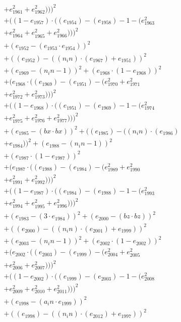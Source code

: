 \documentclass[10pt, a4paper]{article}
\begin{document}
\begin{align*}
& + e_{1961}^{2} + e_{1962}^{2})))^{2} \\
& + ((1 - e_{1957})  \cdot  ((e_{1954}) - (e_{1958}) - 1 - (e_{1963}^{2} \\
& + e_{1964}^{2} + e_{1965}^{2} + e_{1966}^{2})))^{2} \\
& + (e_{1952} - (e_{1953}  \cdot  e_{1954}))^{2} \\
& + ((e_{1952}) - ((n_in)  \cdot  (e_{1967}) + e_{1951}))^{2} \\
& + (e_{1969} - (n_in - 1))^{2} + (e_{1968}  \cdot  (1 - e_{1968}))^{2} \\
& + (e_{1968}  \cdot  ((e_{1969}) - (e_{1951}) - (e_{1970}^{2} + e_{1971}^{2} \\
& + e_{1972}^{2} + e_{1973}^{2})))^{2} \\
& + ((1 - e_{1968})  \cdot  ((e_{1951}) - (e_{1969}) - 1 - (e_{1974}^{2} \\
& + e_{1975}^{2} + e_{1976}^{2} + e_{1977}^{2})))^{2} \\
& + (e_{1985} - (bx  \cdot  bx))^{2} + ((e_{1985}) - ((n_in)  \cdot  (e_{1986}) \\
& + e_{1984}))^{2} + (e_{1988} - (n_in - 1))^{2} \\
& + (e_{1987}  \cdot  (1 - e_{1987}))^{2} \\
& + (e_{1987}  \cdot  ((e_{1988}) - (e_{1984}) - (e_{1989}^{2} + e_{1990}^{2} \\
& + e_{1991}^{2} + e_{1992}^{2})))^{2} \\
& + ((1 - e_{1987})  \cdot  ((e_{1984}) - (e_{1988}) - 1 - (e_{1993}^{2} \\
& + e_{1994}^{2} + e_{1995}^{2} + e_{1996}^{2})))^{2} \\
& + (e_{1983} - (3  \cdot  e_{1984}))^{2} + (e_{2000} - (bz  \cdot  bz))^{2} \\
& + ((e_{2000}) - ((n_in)  \cdot  (e_{2001}) + e_{1999}))^{2} \\
& + (e_{2003} - (n_in - 1))^{2} + (e_{2002}  \cdot  (1 - e_{2002}))^{2} \\
& + (e_{2002}  \cdot  ((e_{2003}) - (e_{1999}) - (e_{2004}^{2} + e_{2005}^{2} \\
& + e_{2006}^{2} + e_{2007}^{2})))^{2} \\
& + ((1 - e_{2002})  \cdot  ((e_{1999}) - (e_{2003}) - 1 - (e_{2008}^{2} \\
& + e_{2009}^{2} + e_{2010}^{2} + e_{2011}^{2})))^{2} \\
& + (e_{1998} - (a_in  \cdot  e_{1999}))^{2} \\
& + ((e_{1998}) - ((n_in)  \cdot  (e_{2012}) + e_{1997}))^{2} \\

\end{align*}
\end{document}
